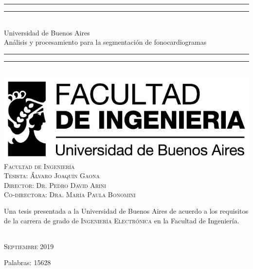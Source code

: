 \begin{titlepage}
  \vspace*{5mm}
  \begin{center}
    \rule[0.5ex]{\linewidth}{2pt}\vspace*{-\baselineskip}\vspace*{3.2pt}
    \rule[0.5ex]{\linewidth}{1pt}\\[\baselineskip]
    {\Huge Universidad de Buenos Aires }\\[4mm]
    {\Large Análisis y procesamiento para la segmentación de fonocardiogramas}\\
    \rule[0.5ex]{\linewidth}{1pt}\vspace*{-\baselineskip}\vspace{3.2pt}
    \rule[0.5ex]{\linewidth}{2pt}\\
    \vspace{6.5mm}
    \includegraphics[scale=0.4]{images/logo-facu-caratula.jpg}\\
    \vspace{6mm}
    {\large %
    \textsc{Facultad de Ingeniería}}\\
    \vspace{6.5mm}
    {\large\textsc{Tesista: Álvaro Joaquín Gaona}}\\
    {\large\textsc{Director: Dr. Pedro David Arini}}\\
    {\large\textsc{Co-directora: Dra. María Paula Bonomini}}\\
    \vspace{11mm}
    \begin{minipage}{14.1cm}
      Una tesis presentada a la Universidad de Buenos Aires de acuerdo a los requisitos de la carrera de grado de
      \textsc{Ingeniería} \textsc{Electrónica} en la Facultad de Ingeniería.
    \end{minipage}\\
    \vspace{9mm}
    {\large\textsc{Septiembre 2019}}
    \vspace{12mm}
  \end{center}
  \begin{flushright}
  {\small Palabras: 15628}
  \end{flushright}
\end{titlepage}
